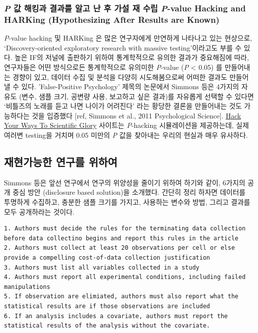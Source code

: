 \documentclass[]{book}
\begin{document}
\hypertarget{p----------p-value-hacking-and-harking-hypothesizing-after-results-are-known}{%
\subsubsection{\texorpdfstring{\emph{P} 값 해킹과 결과를 알고 난 후 가설 재 수립 \emph{P}-value Hacking and HARKing (Hypothesizing After Results are Known)}{P 값 해킹과 결과를 알고 난 후 가설 재 수립 P-value Hacking and HARKing (Hypothesizing After Results are Known)}}\label{p----------p-value-hacking-and-harking-hypothesizing-after-results-are-known}}

\emph{P}-value hacking 및 HARKing 은 많은 연구자에게 만연하게 나타나고 있는 현상으로, `Discovery-oriented exploratory research with massive testing'이라고도 부를 수 있다. 높은 IF의 저널에 출판하기 위하여 통계학적으로 유의한 결과가 중요해짐에 따라, 연구자들은 어떤 방식으로든 통계학적으로 유의미한 \emph{P}-value (\emph{P} \textless{} 0.05) 를 만들어내는 경향이 있고, 데이터 수집 및 분석을 다양히 시도해봄으로써 어떠한 결과도 만들어 낼 수 있다. 'False-Positive Psychology' 제목의 논문에서 Simmons 등은 4가지의 자유도 (변수, 샘플 크기, 공변량 사용, 보고하고 싶은 결과)를 자유롭게 선택할 수 있다면 `비틀즈의 노래를 듣고 나면 나이가 어려진다' 라는 황당한 결론을 만들어내는 것도 가능하다는 것을 입증했다 {[}ref, Simmons et al., 2011 Psychological Science{]}. \href{https://projects.fivethirtyeight.com/p-hacking/}{Hack Your Ways To Scientific Glory} 사이트는 \emph{P}-hacking 시뮬레이션을 제공하는데, 실제 여러변 testing을 거치며 0.05 미만의 \emph{P} 값을 찾아내는 우리의 현실과 매우 유사하다.

\hypertarget{section}{%
\subsection{재현가능한 연구를 위하여}\label{section}}

Simmons 등은 앞선 연구에서 연구의 위양성을 줄이기 위하여 하기와 같이, 6가지의 공개 중심 방안 (disclosure based solution)을 소개했다. 간단히 정리 하자면 데이터를 투명하게 수집하고, 충분한 샘플 크기를 가지고, 사용하는 변수와 방법, 그리고 결과를 모두 공개하라는 것이다.

\begin{verbatim}
1. Authors must decide the rules for the terminating data collection before data collectino begins and report this rules in the article
2. Authors must collect at least 20 observations per cell or else provide a compelling cost-of-data collection justification
3. Authors must list all variables collected in a study
4. Authors must report all experimental conditions, including failed manipulations
5. If observation are elimiated, authors must also report what the statistical results are if those observations are included
6. If an analysis includes a covariate, authors must report the statistical results of the analysis without the covariate. 
\end{verbatim}
\end{document}
